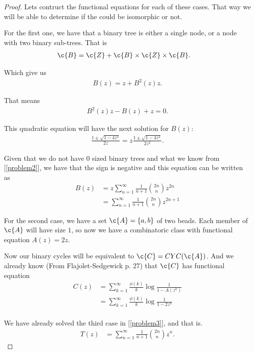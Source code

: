 \begin{proof}
	Lets contruct the functional equations for each of these cases. That way we will be able to determine if the could be
	isomorphic or not.
	
	For the first one, we have that a binary tree is either a single node, or a node with two binary sub-trees. That is
	\begin{align}
			\c{B}	&=	\c{Z} + \c{B} \times \c{Z} \times \c{B}.
	\end{align}
	
	Which give us
	\begin{align}
			B(z) = z + B^2(z) z.
	\end{align}
	
	That means
	\begin{align}
			B^2(z) z - B(z) + z = 0. 
	\end{align}
	
	This quadratic equation will have the next solution for $B(z)$:
	\begin{align}
			\frac{1 \pm \sqrt{1 - 4 z^2}}{2z} = z \frac{1 \pm \sqrt{1 - 4 z^2}}{2z^2}.
	\end{align}
	
	Given that we do not have $0$ sized binary trees and what we know from [\ref{problem2}], we have that the sign is negative and this equation can be written as
	\begin{align}
			B(z) 	&= z \sum_{n=1}^\infty \frac{1}{n+1}\binom{2n}{n}z^{2n}	\\
						&= \sum_{n=1}^\infty \frac{1}{n+1}\binom{2n}{n}z^{2n + 1}
	\end{align}
	
	For the second case, we have a set $\c{A} = \{a, b\}$ of two beads. Each member of $\c{A}$ will have size $1$, so
    now we have a combinatoric class with functional equation $A(z) = 2z$.\pn
    
    Now our binary cycles will be equivalent to $\c{C} = CYC(\c{A})$. And we already know (From Flajolet-Sedgewick p. 27) that
    $\c{C}$ has functional equation
    \begin{align}
        C(z)    &= \sum_{k = 1}^\infty \frac{\phi(k)}{k} \log \frac{1}{1 - A(z^k)}   \\
                &= \sum_{k = 1}^\infty \frac{\phi(k)}{k} \log \frac{1}{1 - 2z^k}     \\  
    \end{align}
    
    We have already solved the third case in [\ref{problem3}], and that is.
    \begin{align}
        T(z)    &=  \sum_{n=1}^{\infty} \frac{1}{n+1} \binom{2n}{n} z^n. 
    \end{align}
    

\end{proof}
